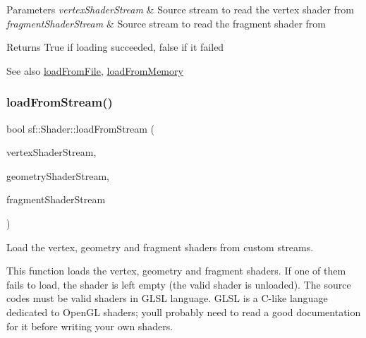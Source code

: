 \begin{DoxyParams}{Parameters}
{\em vertex\+Shader\+Stream} & Source stream to read the vertex shader from \\
\hline
{\em fragment\+Shader\+Stream} & Source stream to read the fragment shader from\\
\hline
\end{DoxyParams}
\begin{DoxyReturn}{Returns}
True if loading succeeded, false if it failed
\end{DoxyReturn}
\begin{DoxySeeAlso}{See also}
\hyperlink{classsf_1_1_shader_a053a5632848ebaca2fcd8ba29abe9e6e}{load\+From\+File}, \hyperlink{classsf_1_1_shader_ac92d46bf71dff2d791117e4e472148aa}{load\+From\+Memory} 
\end{DoxySeeAlso}
\mbox{\label{classsf_1_1_shader_aa08f1c091806205e6654db9d83197fcd}} 
\subsubsection{\texorpdfstring{load\+From\+Stream()}{loadFromStream()}\hspace{0.1cm}{\footnotesize\ttfamily [3/3]}}
{\footnotesize\ttfamily bool sf\+::\+Shader\+::load\+From\+Stream (\begin{DoxyParamCaption}\item[{\hyperlink{classsf_1_1_input_stream}{Input\+Stream} \&}]{vertex\+Shader\+Stream,  }\item[{\hyperlink{classsf_1_1_input_stream}{Input\+Stream} \&}]{geometry\+Shader\+Stream,  }\item[{\hyperlink{classsf_1_1_input_stream}{Input\+Stream} \&}]{fragment\+Shader\+Stream }\end{DoxyParamCaption})}



Load the vertex, geometry and fragment shaders from custom streams. 

This function loads the vertex, geometry and fragment shaders. If one of them fails to load, the shader is left empty (the valid shader is unloaded). The source codes must be valid shaders in G\+L\+SL language. G\+L\+SL is a C-\/like language dedicated to Open\+GL shaders; you\textquotesingle{}ll probably need to read a good documentation for it before writing your own shaders.


